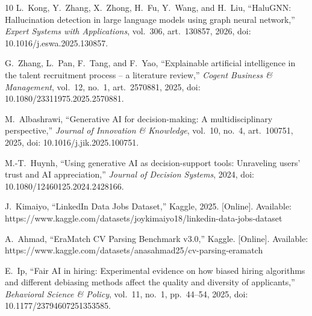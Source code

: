 \documentclass[journal]{IEEEtran}
\begin{document}
\begin{thebibliography}{10}
L.~Kong, Y.~Zhang, X.~Zhong, H.~Fu, Y.~Wang, and H.~Liu, ``HaluGNN: Hallucination detection in large language models using graph neural network,'' \emph{Expert Systems with Applications}, vol.~306, art.~130857, 2026, doi: 10.1016/j.eswa.2025.130857.

G.~Zhang, L.~Pan, F.~Tang, and F.~Yao, ``Explainable artificial intelligence in the talent recruitment process -- a literature review,'' \emph{Cogent Business \& Management}, vol.~12, no.~1, art.~2570881, 2025, doi: 10.1080/23311975.2025.2570881.

M.~Albashrawi, ``Generative AI for decision-making: A multidisciplinary perspective,'' \emph{Journal of Innovation \& Knowledge}, vol.~10, no.~4, art.~100751, 2025, doi: 10.1016/j.jik.2025.100751.

M.-T.~Huynh, ``Using generative AI as decision-support tools: Unraveling users' trust and AI appreciation,'' \emph{Journal of Decision Systems}, 2024, doi: 10.1080/12460125.2024.2428166.

J.~Kimaiyo, ``LinkedIn Data Jobs Dataset,'' Kaggle, 2025. [Online]. Available: https://www.kaggle.com/datasets/joykimaiyo18/linkedin-data-jobs-dataset

A.~Ahmad, ``EraMatch CV Parsing Benchmark v3.0,'' Kaggle. [Online]. Available: https://www.kaggle.com/datasets/anasahmad25/cv-parsing-eramatch

E.~Ip, ``Fair AI in hiring: Experimental evidence on how biased hiring algorithms and different debiasing methods affect the quality and diversity of applicants,'' \emph{Behavioral Science \& Policy}, vol.~11, no.~1, pp.~44--54, 2025, doi: 10.1177/23794607251353585.

\end{thebibliography}
\end{document}
